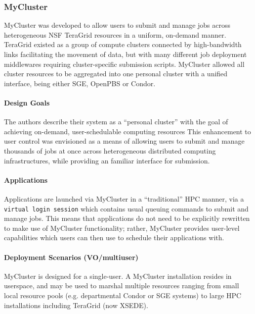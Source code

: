 \documentclass{sig-alternate}
\begin{document}
\subsubsection{MyCluster}

MyCluster was developed to allow users to submit and manage
jobs across heterogeneous NSF TeraGrid resources in a uniform,
on-demand manner.  TeraGrid existed as a group of compute clusters
connected by high-bandwidth links facilitating the movement
of data, but with many different job deployment middlewares
requiring cluster-specific submission scripts.  MyCluster
allowed all cluster resources to be aggregated into one personal cluster with
a unified interface, being either SGE, OpenPBS or Condor.


\paragraph{Design Goals}
The authors describe their system as a ``personal cluster'' with the goal of
achieving on-demand, user-schedulable computing resources
This enhancement to user control was envisioned as a means of allowing users to
submit and manage thousands of jobs at once across heterogeneous distributed
computing infrastructures, while providing an familiar interface for
submission.

\paragraph{Applications}
Applications are launched via MyCluster in a ``traditional''
HPC manner, via a \texttt{virtual
login session} which contains usual queuing commands to submit
and manage jobs.  This means that applications do not need
to be explicitly rewritten to make use of MyCluster functionality;
rather, MyCluster provides user-level \pilotjob capabilities
which users can then use to schedule their applications with.

\paragraph{Deployment Scenarios (VO/multiuser)}
MyCluster is designed for a single-user.  A MyCluster
installation resides in userspace, and may be used
to marshal multiple resources ranging from small local resource pools
(e.g. departmental Condor or SGE systems) to large HPC installations
including TeraGrid (now XSEDE).
\end{document}
